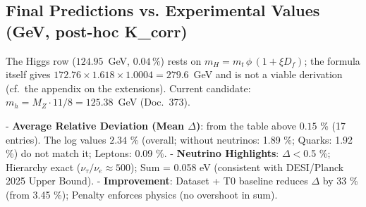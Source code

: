 	\subsection*{Final Predictions vs. Experimental Values (GeV, post-hoc K\_corr)}
		The Higgs row ($124.95$~GeV, $0.04\,\%$) rests on $m_H = m_t\,\phi\,(1+\xi D_f)$; the formula itself gives $172.76 \times 1.618 \times 1.0004 = 279.6$~GeV and is not a viable derivation (cf.\ the appendix on the extensions). Current candidate: $m_h = M_Z \cdot 11/8 = 125.38$~GeV (Doc.~373).

	- \textbf{Average Relative Deviation (Mean $\Delta$)}: from the table above $0.15$ \% (17 entries). The log values $2.34$ \% (overall; without neutrinos: 1.89 \%; Quarks: 1.92 \%) do not match it; Leptons: 0.09 \%.
	- \textbf{Neutrino Highlights}: $\Delta <$0.5 \%; Hierarchy exact ($\nu_{\tau} / \nu_{e} \approx 500$); Sum = 0.058 eV (consistent with DESI/Planck 2025 Upper Bound).
	- \textbf{Improvement}: Dataset + T0 baseline reduces $\Delta$ by 33 \% (from 3.45 \%); Penalty enforces physics (no overshoot in sum).
	
